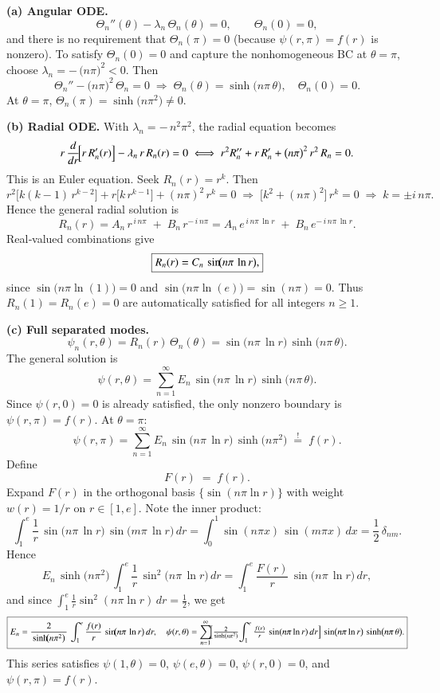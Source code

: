\documentclass{report}
\begin{document}
\textbf{(a) Angular ODE.}  
\[
\Theta_{n}''(\theta) - \lambda_{n}\,\Theta_{n}(\theta) = 0,
\qquad
\Theta_{n}(0)=0,
\]
and there is no requirement that \(\Theta_{n}(\pi)=0\) (because \(\psi(r,\pi)=f(r)\) is nonzero).  To satisfy \(\Theta_{n}(0)=0\) and capture the nonhomogeneous BC at \(\theta=\pi\), choose \(\lambda_{n}=-\,\bigl(n\pi\bigr)^{2}<0\).  Then
\[
\Theta_{n}'' - \bigl(n\pi\bigr)^{2}\,\Theta_{n} = 0 
\;\Longrightarrow\; 
\Theta_{n}(\theta) = \sinh\!\bigl(n\pi\,\theta\bigr),
\quad 
\Theta_{n}(0)=0.
\]
At \(\theta=\pi\), \(\Theta_{n}(\pi) = \sinh\!\bigl(n\pi^{2}\bigr)\neq 0\).  

\textbf{(b) Radial ODE.}  
With \(\lambda_{n} = -\,n^{2}\pi^{2}\), the radial equation becomes
\[
r\,\frac{d}{dr}\!\Bigl[r\,R_{n}'(r)\Bigr] - \lambda_{n}\,r\,R_{n}(r) = 0
\;\Longleftrightarrow\;
r^{2}R_{n}'' + r\,R_{n}' + \bigl(n\pi\bigr)^{2}\,r^{2}\,R_{n} = 0.
\]
This is an Euler equation.  Seek \(R_{n}(r) = r^{k}\).  Then
\[
r^{2}\bigl[k(k-1)\,r^{k-2}\bigr] + r\bigl[k\,r^{k-1}\bigr] + (n\pi)^{2}\,r^{k} = 0
\;\Longrightarrow\;
\bigl[k^{2} + (n\pi)^{2}\bigr]\,r^{k} = 0
\;\Longrightarrow\;
k = \pm i\,n\pi.
\]
Hence the general radial solution is
\[
R_{n}(r) 
= A_{n}\,r^{\,i\,n\pi} \;+\; B_{n}\,r^{-\,i\,n\pi}
= A_{n}\,e^{\,i\,n\pi\,\ln r} \;+\; B_{n}\,e^{-\,i\,n\pi\,\ln r}.
\]
Real‐valued combinations give
\[
\boxed{%
R_{n}(r) = C_{n}\,\sin\!\bigl(n\pi\,\ln r\bigr),
}
\]
since \(\sin\bigl(n\pi\ln(1)\bigr)=0\) and \(\sin\bigl(n\pi\ln(e)\bigr) = \sin(n\pi)=0\).  Thus \(R_{n}(1)=R_{n}(e)=0\) are automatically satisfied for all integers \(n\ge1\).

\textbf{(c) Full separated modes.}  
\[
\psi_{n}(r,\theta) 
= R_{n}(r)\,\Theta_{n}(\theta)
= \sin\!\bigl(n\pi\,\ln r\bigr)\,\sinh\!\bigl(n\pi\,\theta\bigr).
\]
The general solution is
\[
\psi(r,\theta) 
= \sum_{n=1}^{\infty} E_{n}\,
\sin\!\bigl(n\pi\,\ln r\bigr)\,\sinh\!\bigl(n\pi\,\theta\bigr).
\]
Since \(\psi(r,0)=0\) is already satisfied, the only nonzero boundary is \(\psi(r,\pi)=f(r)\).  At \(\theta=\pi\):
\[
\psi(r,\pi) 
= \sum_{n=1}^{\infty} E_{n}\,\sin\!\bigl(n\pi\,\ln r\bigr)\,\sinh\!\bigl(n\pi^{2}\bigr)
\;\stackrel{!}{=}\; f(r).
\]
Define 
\[
F(r) \;=\; f(r).
\]
Expand \(F(r)\) in the orthogonal basis \(\{\sin(n\pi\ln r)\}\) with weight \(w(r)=1/r\) on \(r\in[1,e]\).  Note the inner product:
\[
\int_{1}^{e} \frac{1}{r}\,\sin\!\bigl(n\pi\,\ln r\bigr)\,
\sin\!\bigl(m\pi\,\ln r\bigr)\,dr 
= \int_{0}^{1} \sin(n\pi x)\,\sin(m\pi x)\,dx
= \frac{1}{2}\,\delta_{nm}.
\]
Hence
\[
E_{n}\,\sinh\!\bigl(n\pi^{2}\bigr)\,\int_{1}^{e} \frac{1}{r}\,\sin^{2}\!\bigl(n\pi\,\ln r\bigr)\,dr
= \int_{1}^{e} \frac{F(r)}{r}\,\sin\!\bigl(n\pi\,\ln r\bigr)\,dr,
\]
and since \(\int_{1}^{e}\frac{1}{r}\sin^{2}(n\pi\ln r)\,dr = \tfrac12\), we get
\[
\boxed{%
E_{n}
= \frac{2}{\,\sinh\!\bigl(n\pi^{2}\bigr)\,}\,
\int_{1}^{e} \frac{f(r)}{r}\,\sin\!\bigl(n\pi\,\ln r\bigr)\,dr,
\quad
\psi(r,\theta) 
= \sum_{n=1}^{\infty}\!
\Bigl[\tfrac{2}{\sinh(n\pi^{2})}\!\int_{1}^{e}\tfrac{f(r)}{r}\,\sin(n\pi\ln r)\,dr\Bigr]\,
\sin\bigl(n\pi\ln r\bigr)\,\sinh\bigl(n\pi\,\theta\bigr).
}
\]
This series satisfies 
\(\psi(1,\theta)=0\), \(\psi(e,\theta)=0\), 
\(\psi(r,0)=0\), and \(\psi(r,\pi)=f(r)\).
\end{document}
